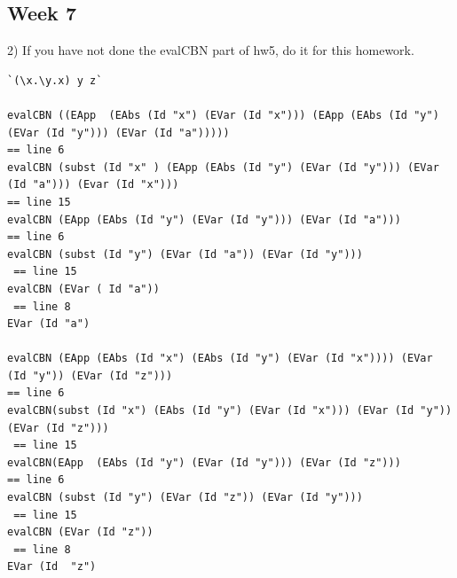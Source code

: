 \documentclass{article}
\theoremstyle{theorem}
\theoremstyle{definition}
\theoremstyle{remark}
\begin{document}
\subsection{Week 7}


2) If you have not done the evalCBN part of hw5, do it for this homework.
\begin{lstlisting}
`(\x.\y.x) y z`

evalCBN ((EApp  (EAbs (Id "x") (EVar (Id "x"))) (EApp (EAbs (Id "y") (EVar (Id "y"))) (EVar (Id "a")))))
== line 6
evalCBN (subst (Id "x" ) (EApp (EAbs (Id "y") (EVar (Id "y"))) (EVar (Id "a"))) (Evar (Id "x"))) 
== line 15
evalCBN (EApp (EAbs (Id "y") (EVar (Id "y"))) (EVar (Id "a")))
== line 6
evalCBN (subst (Id "y") (EVar (Id "a")) (EVar (Id "y")))
 == line 15
evalCBN (EVar ( Id "a"))
 == line 8
EVar (Id "a")

evalCBN (EApp (EAbs (Id "x") (EAbs (Id "y") (EVar (Id "x")))) (EVar (Id "y")) (EVar (Id "z"))) 
== line 6
evalCBN(subst (Id "x") (EAbs (Id "y") (EVar (Id "x"))) (EVar (Id "y")) (EVar (Id "z")))
 == line 15
evalCBN(EApp  (EAbs (Id "y") (EVar (Id "y"))) (EVar (Id "z")))
== line 6
evalCBN (subst (Id "y") (EVar (Id "z")) (EVar (Id "y")))
 == line 15
evalCBN (EVar (Id "z")) 
 == line 8
EVar (Id  "z")
\end{lstlisting}
\end{document}
